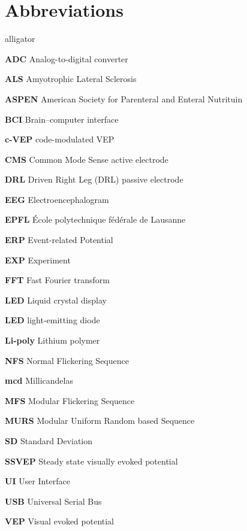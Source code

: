 \chapter*{Abbreviations}
\begin{labeling}{alligator}
	\item[\textbf{ADC}]	Analog-to-digital converter
	\item[\textbf{ALS}]	Amyotrophic Lateral Sclerosis
	\item[\textbf{ASPEN}] American Society for Parenteral and Enteral Nutrituin
	\item[\textbf{BCI}] Brain–computer interface
	\item[\textbf{c-VEP}] code-modulated VEP
	\item[\textbf{CMS}] Common Mode Sense active electrode
	\item[\textbf{DRL}]  Driven Right Leg (DRL) passive electrode
	\item[\textbf{EEG}] Electroencephalogram
	\item[\textbf{EPFL}] École polytechnique fédérale de Lausanne
	\item[\textbf{ERP}] Event-related Potential
	\item[\textbf{EXP}] Experiment
	\item[\textbf{FFT}] Fast Fourier transform
	\item[\textbf{LED}] Liquid crystal display
	\item[\textbf{LED}] light-emitting diode
	\item[\textbf{Li-poly}] Lithium polymer
	\item[\textbf{NFS}] Normal Flickering Sequence 
	\item[\textbf{mcd}] Millicandelas 
	\item[\textbf{MFS}] Modular Flickering Sequence 
	\item[\textbf{MURS}] Modular Uniform Random based Sequence 
	\item[\textbf{SD}] Standard Deviation
	\item[\textbf{SSVEP}] Steady state visually evoked potential
	\item[\textbf{UI}] User Interface
	\item[\textbf{USB}] Universal Serial Bus
	\item[\textbf{VEP}] Visual evoked potential
	
\end{labeling}